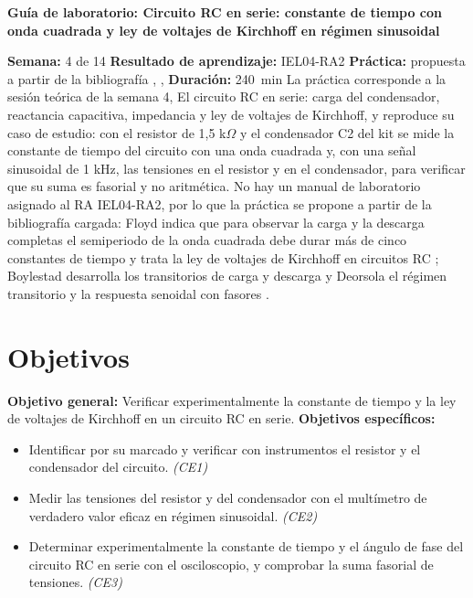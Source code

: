 \documentclass[12pt]{article}
\begin{document}
\nocite{ref1,ref2,ref3}

\datosguia
\lineablanco

{\centering\bfseries Guía de laboratorio: Circuito RC en serie: constante de tiempo con onda cuadrada y ley de voltajes de Kirchhoff en régimen sinusoidal\par}
\lineablanco
\textbf{Semana:} 4 de 14 \quad \textbf{Resultado de aprendizaje:} IEL04-RA2 \quad \textbf{Práctica:} propuesta a partir de la bibliografía \cite{ref1}, \cite{ref2}, \cite{ref3} \quad \textbf{Duración:} \SI{240}{\minute}
\lineablanco
La práctica corresponde a la sesión teórica de la semana 4, \guillemotleft{}El circuito RC en serie: carga del condensador, reactancia capacitiva, impedancia y ley de voltajes de Kirchhoff\guillemotright{}, y reproduce su caso de estudio: con el resistor de 1,5 k\ensuremath{\Omega} y el condensador C2 del kit se mide la constante de tiempo del circuito con una onda cuadrada y, con una señal sinusoidal de 1 kHz, las tensiones en el resistor y en el condensador, para verificar que su suma es fasorial y no aritmética. No hay un manual de laboratorio asignado al RA IEL04-RA2, por lo que la práctica se propone a partir de la bibliografía cargada: Floyd indica que para observar la carga y la descarga completas el semiperiodo de la onda cuadrada debe durar más de cinco constantes de tiempo y trata la ley de voltajes de Kirchhoff en circuitos RC \cite{ref1}; Boylestad desarrolla los transitorios de carga y descarga \cite{ref2} y Deorsola el régimen transitorio y la respuesta senoidal con fasores \cite{ref3}.

\section{Objetivos}\label{sec:objetivos}
\textbf{Objetivo general:} Verificar experimentalmente la constante de tiempo y la ley de voltajes de Kirchhoff en un circuito RC en serie.
\lineablanco
\textbf{Objetivos específicos:}
\begin{itemize}
  \item Identificar por su marcado y verificar con instrumentos el resistor y el condensador del circuito. \emph{(CE1)}
  \item Medir las tensiones del resistor y del condensador con el multímetro de verdadero valor eficaz en régimen sinusoidal. \emph{(CE2)}
  \item Determinar experimentalmente la constante de tiempo y el ángulo de fase del circuito RC en serie con el osciloscopio, y comprobar la suma fasorial de tensiones. \emph{(CE3)}
\end{itemize}
\end{document}
